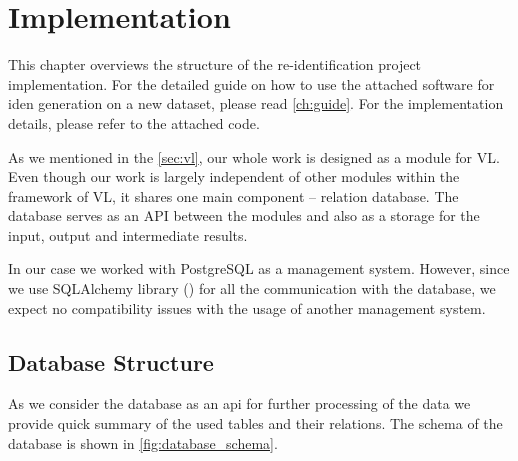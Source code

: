 \chapter{Implementation}

\label{ch:implementation}

This chapter overviews the structure of the re-identification project implementation. For the detailed guide on how to use the attached software for \gls{iden} generation on a new dataset, please read \autoref{ch:guide}. For the implementation details, please refer to the attached code.

As we mentioned in the \autoref{sec:vl}, our whole work is designed as a module for \gls{VL}. Even though our work is largely independent of other modules within the framework of \gls{VL}, it shares one main component -- relation database. The database serves as an API between the modules and also as a storage for the input, output and intermediate results.

In our case we worked with PostgreSQL as a management system. However, since we use SQLAlchemy library (\cite{sqlalchemy}) for all the communication with the database, we expect no compatibility issues with the usage of another management system.

\section{Database Structure}

As we consider the database as an \gls{api} for further processing of the data we provide quick summary of the used tables and their relations. The schema of the database is shown in \autoref{fig:database_schema}.


